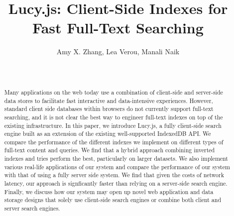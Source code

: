 \documentclass{vldb}
\begin{document}

\title{Lucy.js: Client-Side Indexes for Fast Full-Text Searching}




\author{
\alignauthor Amy X. Zhang, Lea Verou, Manali Naik\\
\vspace{.2cm}
	\\
	 \\
}

\maketitle

\begin{abstract}

Many applications on the web today use a combination of client-side and server-side data stores to facilitate fast interactive and data-intensive experiences. 
However, standard client side databases within browsers do not currently support full-text searching, and it is not clear the best way to engineer full-text indexes on top of the existing infrastructure.
In this paper, we introduce Lucy.js, a fully client-side search engine built as an extension of the existing well-supported IndexedDB API.
We compare the performance of the different indexes we implement on different types of full-text content and queries. We find that a hybrid approach combining inverted indexes and tries perform the best, particularly on larger datasets.
We also implement various real-life applications of our system and compare the performance of our system with that of using a fully server side system. We find that given the costs of network latency, our approach is signficantly faster than relying on a server-side search engine.
Finally, we discuss how our system may open up novel web application and data storage designs that solely use client-side search engines or combine both client and server search engines.
\end{abstract}
\end{document}
